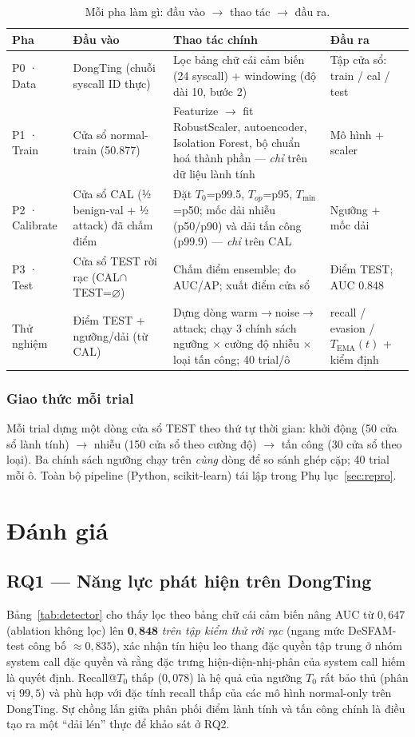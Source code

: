 \documentclass[conference,10pt]{IEEEtran}
\begin{document}
\begin{table}[t]
\caption{Mỗi pha làm gì: đầu vào $\to$ thao tác $\to$ đầu ra.}
\label{tab:phases}
\centering
\renewcommand{\arraystretch}{1.25}
\begin{tabular}{@{}p{1.6cm}p{3.6cm}p{7.6cm}p{3.0cm}@{}}
\toprule
\textbf{Pha} & \textbf{Đầu vào} & \textbf{Thao tác chính} & \textbf{Đầu ra} \\
\midrule
P0 · Data & DongTing (chuỗi syscall ID thực) & Lọc bảng chữ cái cảm biến (24 syscall) + windowing (độ dài 10, bước 2) & Tập cửa sổ: train / cal / test \\
P1 · Train & Cửa sổ normal-train (50.877) & Featurize $\to$ fit RobustScaler, autoencoder, Isolation Forest, bộ chuẩn hoá thành phần — \textit{chỉ} trên dữ liệu lành tính & Mô hình + scaler \\
P2 · Calibrate & Cửa sổ CAL (½ benign-val + ½ attack) đã chấm điểm & Đặt $T_0$=p99.5, $T_{op}$=p95, $T_{\min}$=p50; mốc dải nhiễu (p50/p90) và dải tấn công (p99.9) — \textit{chỉ} trên CAL & Ngưỡng + mốc dải \\
P3 · Test & Cửa sổ TEST rời rạc (CAL$\cap$TEST=$\varnothing$) & Chấm điểm ensemble; đo AUC/AP; xuất điểm cửa sổ & Điểm TEST; AUC 0.848 \\
Thử nghiệm & Điểm TEST + ngưỡng/dải (từ CAL) & Dựng dòng warm$\to$noise$\to$attack; chạy 3 chính sách ngưỡng $\times$ cường độ nhiễu $\times$ loại tấn công; 40 trial/ô & recall / evasion / $T_{\text{EMA}}(t)$ + kiểm định \\
\bottomrule
\end{tabular}
\end{table}

\subsubsection{Giao thức mỗi trial}
Mỗi trial dựng một dòng cửa sổ TEST theo thứ tự thời gian: khởi động (50 cửa sổ lành tính) $\to$ nhiễu (150 cửa sổ theo cường độ) $\to$ tấn công (30 cửa sổ theo loại). Ba chính sách ngưỡng chạy trên \textit{cùng} dòng để so sánh ghép cặp; 40 trial mỗi ô. Toàn bộ pipeline (Python, scikit-learn) tái lập trong Phụ lục~\ref{sec:repro}.

\section{Đánh giá}

\subsection{RQ1 — Năng lực phát hiện trên DongTing}
Bảng~\ref{tab:detector} cho thấy lọc theo bảng chữ cái cảm biến nâng AUC từ $0{,}647$ (ablation không lọc) lên $\mathbf{0{,}848}$ \textit{trên tập kiểm thử rời rạc} (ngang mức DeSFAM-test công bố $\approx0{,}835$), xác nhận tín hiệu leo thang đặc quyền tập trung ở nhóm system call đặc quyền và rằng đặc trưng hiện-diện-nhị-phân của system call hiếm là quyết định. Recall@$T_0$ thấp ($0{,}078$) là hệ quả của ngưỡng $T_0$ rất bảo thủ (phân vị $99{,}5$) và phù hợp với đặc tính recall thấp của các mô hình normal-only trên DongTing. Sự chồng lấn giữa phân phối điểm lành tính và tấn công chính là điều tạo ra một ``dải lén'' thực để khảo sát ở RQ2.
\end{document}
